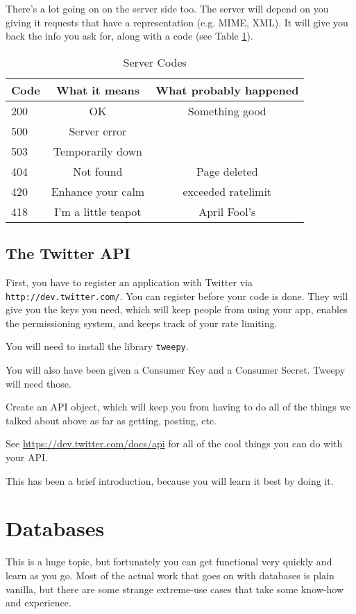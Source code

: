 \documentclass[12pt,letter]{article}
\begin{document}
There's a lot going on on the server side too. The server will depend
on you giving it requests that have a representation (e.g. MIME,
XML). It will give you back the info you ask for, along with a code
(see Table \ref{server_codes}).

\begin{table}
\begin{center}
\caption{Server Codes}
\label{server_codes}
\begin{tabular}{lcc}
Code & What it means & What probably happened \\
\hline
200 & OK & Something good \\
500 & Server error & \\
503 & Temporarily down & \\
404 & Not found & Page deleted \\
420 & Enhance your calm & exceeded ratelimit \\
418 & I'm a little teapot & April Fool's \\
\hline
\end{tabular}
\end{center}
\end{table}

\subsection{The Twitter API}

First, you have to register an application with Twitter via
\texttt{http://dev.twitter.com/}. You can register before your code is done. They will give you the
keys you need, which will keep people from using your app, enables the
permissioning system, and keeps track of your rate limiting. 

You will need to install the library \texttt{tweepy}. 

You will also have been given a Consumer Key and a Consumer
Secret. Tweepy will need those. 

Create an API object, which will keep you from having to do all of the
things we talked about above as far as getting, posting, etc. 

See \url{https://dev.twitter.com/docs/api} for all of the cool things
you can do with your API.


This has been a brief introduction, because you will learn it best by
doing it. 

\section{Databases}
This is a huge topic, but fortunately you can get functional very
quickly and learn as you go. Most of the actual work that goes on with
databases is plain vanilla, but there are some strange extreme-use
cases that take some know-how and experience. 
\end{document}
